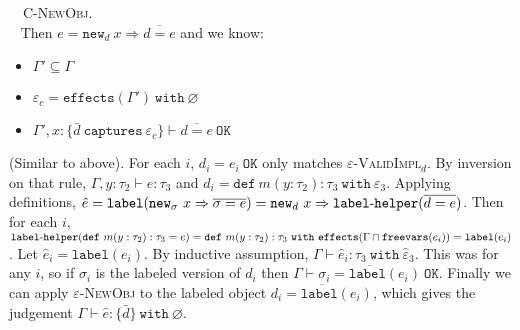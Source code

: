 \documentclass{llncs}
\newcommand{\keywadj}[1]{\mathtt{#1}}
\newcommand{\keyw}[1]{\keywadj{#1}~}
\newcommand{\hyphen}{\hbox{-}}
\newcommand{\proofcase}[2]{
	\begin{adjustwidth}{1.5em}{0pt}
		\fbox{Case.}~~#1. \\ ~#2
	\end{adjustwidth}
}
\newcommand{\newd}[0]{
	\keywadj{new}_d~x \Rightarrow \overline{d = e}
}
\newcommand{\newsig}[0]{
	\keywadj{new}_\sigma~x \Rightarrow \overline{\sigma = e}
}
\begin{document}
{\proofcase{\textsc{C-NewObj}}{
Then $e = \newd$ and we know:
\begin{itemize}
	\item $\Gamma' \subseteq \Gamma$
	\item $\varepsilon_c = \keywadj{effects}(\Gamma')~\keyw{with} \varnothing$
	\item $\Gamma', x : \{ \bar d~\keyw{captures} \varepsilon_c \} \vdash \overline{d = e}~\keyw{OK}$
\end{itemize}
(Similar to above). For each $i$, $d_i = e_i~\keywadj{OK}$ only matches \textsc{$\varepsilon$-ValidImpl$_d$}. By inversion on that rule, $\Gamma, y : \tau_2 \vdash e: \tau_3$ and $d_i = \keyw{def} m(y : \tau_2) : \tau_3~\keyw{with} \varepsilon_3$. Applying definitions, $\hat e = \keywadj{label}(\newsig) = \keywadj{new}_d~x \Rightarrow \keywadj{label \hyphen helper}(\overline{d = e})$. Then for each $i$, $\keywadj{label \hyphen helper}(\keywadj{def}~m(y : \tau_2) : \tau_3 = e) = \keywadj{def}~m(y : \tau_2) : \tau_3~\keyw{with}  \keywadj{effects}(\Gamma \cap \keywadj{freevars}(e_i)) = \keywadj{label}(e_i)$. Let $\hat e_i = \keywadj{label}(e_i)$. By inductive assumption, $\Gamma \vdash \hat e_i : \tau_3~\keyw{with} \hat \varepsilon_3$. This was for any $i$, so if $\sigma_i$ is the labeled version of $d_i$ then $\Gamma \vdash \overline{ \sigma_i = \keywadj{label}(e_i) }~\keywadj{OK}$. Finally we can apply \textsc{$\varepsilon$-NewObj} to the labeled object $\overline{ d_i = \keywadj{label}(e_i) }$, which gives the judgement $\Gamma \vdash \hat e : \{ \bar d \}~\keyw{with} \varnothing$.
}
}
\end{document}

